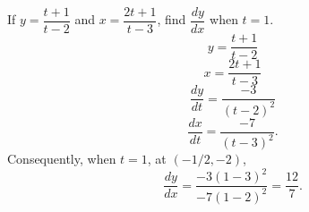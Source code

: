 If $y= \dfrac{t+1}{t-2}$ and $x = \dfrac{2t+1}{t-3}$, find $\dfrac{dy}{dx}$ when $t = 1$.
\newline
\[
y = \frac{t+1}{t-2}
\]
\[
x = \frac{2t+1}{t-3}
\]
\[
\frac{dy}{dt} = \frac{-3}{(t-2)^2}
\]
\[
\frac{dx}{dt} = \frac{-7}{(t-3)^2}.
\]
Consequently, when $t=1$, at $(-1/2, -2)$,
\[
\frac{dy}{dx} = \frac{-3(1-3)^2}{-7(1-2)^2} = \frac{12}{7}.
\]